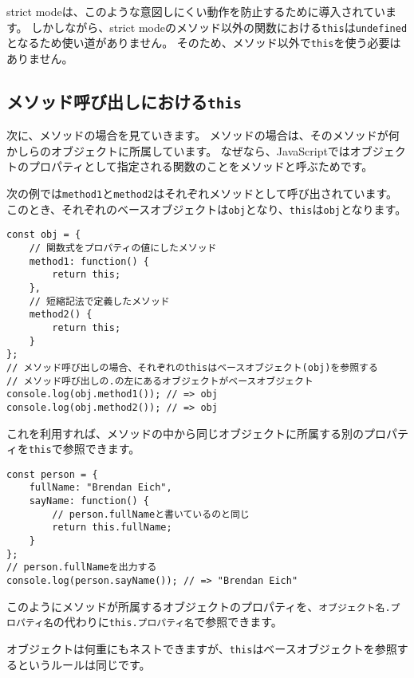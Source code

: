 strict
modeは、このような意図しにくい動作を防止するために導入されています。
しかしながら、strict
modeのメソッド以外の関数における\texttt{this}は\texttt{undefined}となるため使い道がありません。
そのため、メソッド以外で\texttt{this}を使う必要はありません。

\hypertarget{method-this}{%
\subsection{\texorpdfstring{メソッド呼び出しにおける\texttt{this}}{メソッド呼び出しにおけるthis}}\label{method-this}}

次に、メソッドの場合を見ていきます。
メソッドの場合は、そのメソッドが何かしらのオブジェクトに所属しています。
なぜなら、JavaScriptではオブジェクトのプロパティとして指定される関数のことをメソッドと呼ぶためです。

次の例では\texttt{method1}と\texttt{method2}はそれぞれメソッドとして呼び出されています。
このとき、それぞれのベースオブジェクトは\texttt{obj}となり、\texttt{this}は\texttt{obj}となります。

\begin{lstlisting}
const obj = {
    // 関数式をプロパティの値にしたメソッド
    method1: function() {
        return this;
    },
    // 短縮記法で定義したメソッド
    method2() {
        return this;
    }
};
// メソッド呼び出しの場合、それぞれのthisはベースオブジェクト(obj)を参照する
// メソッド呼び出しの.の左にあるオブジェクトがベースオブジェクト
console.log(obj.method1()); // => obj
console.log(obj.method2()); // => obj
\end{lstlisting}

\enlargethispage{\baselineskip}これを利用すれば、メソッドの中から同じオブジェクトに所属する別のプロパティを\texttt{this}で参照できます。

\begin{lstlisting}
const person = {
    fullName: "Brendan Eich",
    sayName: function() {
        // person.fullNameと書いているのと同じ
        return this.fullName;
    }
};
// person.fullNameを出力する
console.log(person.sayName()); // => "Brendan Eich"
\end{lstlisting}

このようにメソッドが所属するオブジェクトのプロパティを、\texttt{オブジェクト名.\hbox{}プロパティ名}の代わりに\texttt{this.\hbox{}プロパティ名}で参照できます。

オブジェクトは何重にもネストできますが、\texttt{this}はベースオブジェクトを参照するというルールは同じです。

